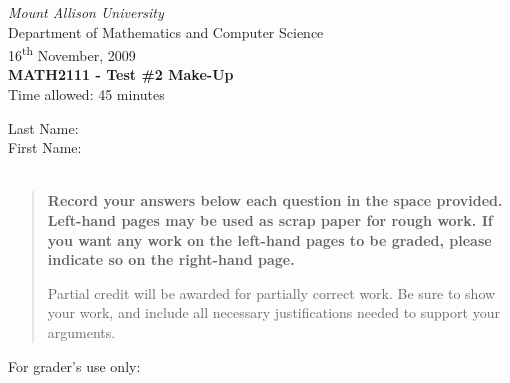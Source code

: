 \documentclass[12pt]{article}
\newcommand{\skipline}{\vspace{12pt}}
\begin{document}
\author{Sean Fitzpatrick}
\thispagestyle{plain}
\begin{center}
\emph{Mount Allison University}\\
Department of Mathematics and Computer Science\\
16\textsuperscript{th} November, 2009\\
{\bf MATH2111 - Test \#2 Make-Up}\\
Time allowed: 45 minutes
\end{center}
\skipline \skipline \skipline \noindent \skipline
Last Name:\underline{\hspace{350pt}}\\
\skipline
First Name:\underline{\hspace{348pt}}\\
\\

\vspace{2in}


\begin{quote}
 {\bf Record your answers below each question in the space provided.    Left-hand pages may be used as scrap paper for rough work.  If you want any work on the left-hand pages to be graded, please indicate so on the right-hand page.
 
 \bigskip
 
Partial credit will be awarded for partially correct work. Be sure to show your work, and include all necessary justifications needed to support your arguments.}
\end{quote}

\vspace{2in}

For grader's use only:
\end{document}
